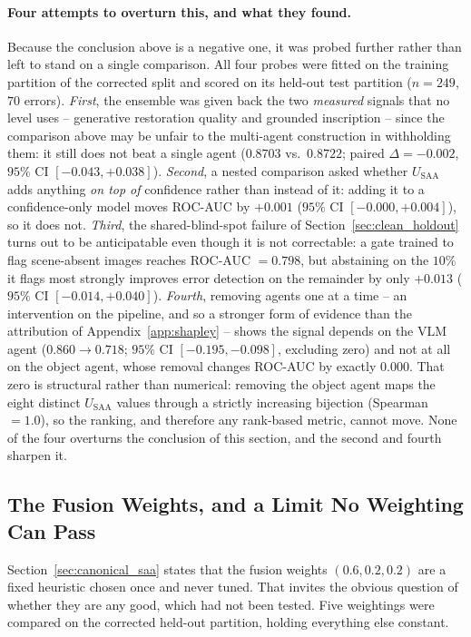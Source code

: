 \documentclass[12pt,a4paper]{report}
\begin{document}
\paragraph{Four attempts to overturn this, and what they found.} Because the conclusion above is a negative one, it was probed further rather than left to stand on a single comparison. All four probes were fitted on the training partition of the corrected split and scored on its held-out test partition ($n=249$, $70$ errors). \emph{First}, the ensemble was given back the two \emph{measured} signals that no level uses -- generative restoration quality and grounded inscription -- since the comparison above may be unfair to the multi-agent construction in withholding them: it still does not beat a single agent ($0.8703$ vs.\ $0.8722$; paired $\Delta = -0.002$, $95\%$ CI $[-0.043, +0.038]$). \emph{Second}, a nested comparison asked whether $U_{\text{SAA}}$ adds anything \emph{on top of} confidence rather than instead of it: adding it to a confidence-only model moves ROC-AUC by $+0.001$ ($95\%$ CI $[-0.000, +0.004]$), so it does not. \emph{Third}, the shared-blind-spot failure of Section~\ref{sec:clean_holdout} turns out to be anticipatable even though it is not correctable: a gate trained to flag scene-absent images reaches ROC-AUC $=0.798$, but abstaining on the $10\%$ it flags most strongly improves error detection on the remainder by only $+0.013$ ($95\%$ CI $[-0.014, +0.040]$). \emph{Fourth}, removing agents one at a time -- an intervention on the pipeline, and so a stronger form of evidence than the attribution of Appendix~\ref{app:shapley} -- shows the signal depends on the VLM agent ($0.860 \to 0.718$; $95\%$ CI $[-0.195, -0.098]$, excluding zero) and not at all on the object agent, whose removal changes ROC-AUC by exactly $0.000$. That zero is structural rather than numerical: removing the object agent maps the eight distinct $U_{\text{SAA}}$ values through a strictly increasing bijection (Spearman $=1.0$), so the ranking, and therefore any rank-based metric, cannot move. None of the four overturns the conclusion of this section, and the second and fourth sharpen it.

\subsection{The Fusion Weights, and a Limit No Weighting Can Pass}
\label{sec:weight_sensitivity}

Section~\ref{sec:canonical_saa} states that the fusion weights $(0.6, 0.2, 0.2)$ are a fixed
heuristic chosen once and never tuned. That invites the obvious question of whether they are any
good, which had not been tested. Five weightings were compared on the corrected held-out
partition, holding everything else constant.
\end{document}
